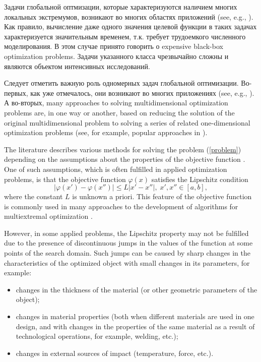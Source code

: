 \documentclass[runningheads]{llncs}
\begin{document}
Задачи глобальной оптмизации, которые характеризуются наличием многих локальных экстремумов, возникают во многих областях приложений (see, e.g., \cite{Cavoretto2021,Kvasov2015,Kvasov2013,Modorskii2016}). Как правило, вычисление даже одного значения целевой функции в таких задачах характеризуется значительным временем, т.к. требует трудоемкого численного моделирования. В этом случае принято говорить о expensive black-box optimization problems. Задачи указанного класса чрезвычайно сложны и являются объектом интенсивных исследований.

Следует отметить важную роль одномерных задач глобальной оптимизации. Во-первых, как уже отмечалось, они возникают во многих приложениях (see, e.g., \cite{Gillard2017,Sergeyev2020}). А во-вторых,  
 many approaches to solving multidimensional optimization problems are, in one way or another, based on reducing the solution of the original multidimensional problem to solving a series of related one-dimensional optimization problems (see, for example, popular approaches in \cite{Pinter1996,PaulaviciusZilinskas2014,Sergeyev2017,Sergeyev2013}).

The literature describes various methods for solving the problem (\ref{problem}) depending on the assumptions about the properties of the objective function \cite{Horst1995,Horst1996,Pinter1996}. One of such assumptions, which is often fulfilled in applied optimization problems, is that the objective function $\varphi(x)$ satisfies the Lipschitz condition 
\[
\left|\varphi(x')-\varphi(x'')\right|\leq L\left|x'-x''\right|,\; x',x'' \in [a,b],
\]
where the constant $L$ is unknown a priori. 
This feature of the objective function is commonly used in many approaches to the development of algorithms for multiextremal optimization \cite{Evtushenko2009,Evtushenko2013,Jones2009,Paulavicius2011}.



However, in some applied problems, the Lipschitz property may not be fulfilled due to the presence of discontinuous jumps in the values of the function at some points of the search domain. Such jumps can be caused by sharp changes in the characteristics of the optimized object with small changes in its parameters, for example:
\begin{itemize}
  \item changes in the thickness of the material (or other geometric parameters of the object);
  \item changes in material properties (both when different materials are used in one design, and with changes in the properties of the same material as a result of technological operations, for example, welding, etc.);
  \item changes in external sources of impact (temperature, force, etc.).
\end{itemize}
\end{document}
